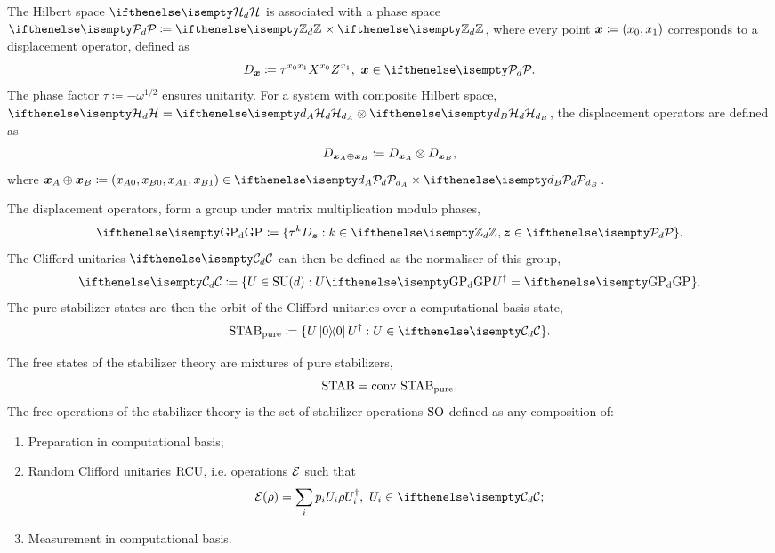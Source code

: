 \documentclass[pra,
aps,
twocolumn,
superscriptaddress,
groupedaddress,
nofootinbib,
reprint
]{revtex4-1}
\begin{document}
The Hilbert space $\hd$ is associated with a phase space $\pd \coloneqq \zd \times \zd$, where every point $\bm{x} \coloneqq (x_0, x_1)$ corresponds to a displacement operator, defined as
\begin{equation}\label{eq:ddef}
    D_{\bmx} \coloneqq \tau^{x_0 x_1} X^{x_0} Z^{x_1},\ \bmx  \in \pd.
\end{equation}
The phase factor $\tau \coloneqq -\omega^{1/2}$ ensures unitarity.
For a system with composite Hilbert space, $\hd = \hd[d_A] \otimes \hd[d_B]$, the displacement operators are defined as
\begin{equation}\label{eq:composited}
    D_{\bm{x}_A \oplus \bm{x}_B} \coloneqq D_{\bm{x}_A} \otimes D_{\bm{x}_B},
\end{equation}
where $\bmx_A \oplus \bmx_B \coloneqq (x_{A0}, x_{B0}, x_{A1}, x_{B1}) \in \pd[d_A] \times \pd[d_B]$.

The displacement operators, form a group under matrix multiplication modulo phases,
\begin{equation}\label{eq:gp}
    \gp \coloneqq \{ \tau^k D_{\bmz}: k \in \zd, \bmz \in \pd\}.
\end{equation}
The Clifford unitaries $\cd$ can then be defined as the normaliser of this group, 
\begin{equation}
    \cd \coloneqq \{ U \in {\rm{SU}}(d): U\gp U^\dagger = \gp \}.
\end{equation}
The pure stabilizer states are then the orbit of the Clifford unitaries over a computational basis state,
\begin{equation}\label{eq:stab}
    \stab_{{\rm{pure}}} \coloneqq \{ U\ketbra{0}{0}U^\dagger: U \in \cd \}.
\end{equation}

The free states of the stabilizer theory are mixtures of pure stabilizers, 
\begin{equation}
    \stab = \conv\ \stab_{{\rm{pure}}}.
\end{equation}
The free operations of the stabilizer theory is the set of stabilizer operations ${\rm{SO}}$ defined as any composition of:
\begin{enumerate}
    \item Preparation in computational basis;
    \item Random Clifford unitaries ${\rm{RCU}}$, i.e. operations $\mathcal{E}$ such that 
    \begin{equation}
        \E(\rho) = \sum_i p_i U_i \rho U_i^\dagger,\ U_i \in \cd;
\end{equation}
    \item Measurement in computational basis.
\end{enumerate}
\end{document}
